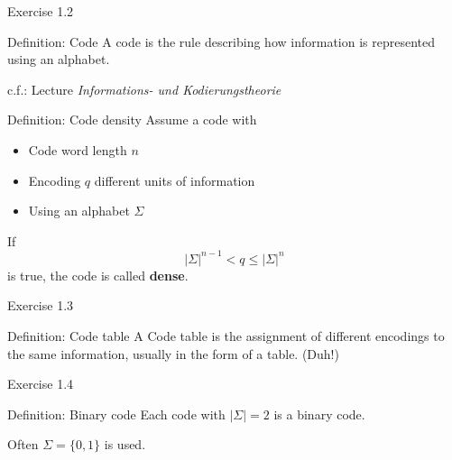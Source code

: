 \documentclass[11pt]{tudbeamer}
\begin{document}
\begin{frame}{Exercise 1.2}

	\begin{block}{Definition: Code}
		A code is the rule describing how information is represented using an alphabet.
	\end{block}
	
	c.f.: Lecture \textit{Informations- und Kodierungstheorie}
	
	\begin{block}{Definition: Code density}
		Assume a code with
		\begin{itemize}
			\item Code word length $n$
			\item Encoding $q$ different units of information
			\item Using an alphabet $\Sigma$
		\end{itemize}
		
		If $$|\Sigma|^{n-1} < q \leq |\Sigma|^n$$ is true, the code is called \textbf{dense}.
	\end{block}

\end{frame}

\begin{frame}{Exercise 1.3}

	\begin{block}{Definition: Code table}
		A Code table is the assignment of different encodings to the same information, usually in the form of a table. (Duh!)
	\end{block}
	
\end{frame}

\begin{frame}{Exercise 1.4}
	
	\begin{block}{Definition: Binary code}
		Each code with $|\Sigma| = 2$ is a binary code.
	\end{block}
	
	Often $\Sigma = \lbrace 0, 1 \rbrace$ is used.

\end{frame}
\end{document}
